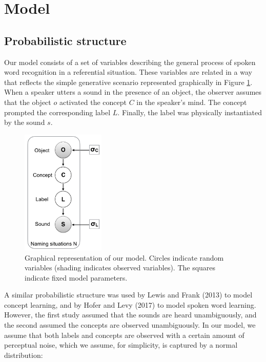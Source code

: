 \documentclass[english,,man,floatsintext]{apa6}
\theoremstyle{definition}
\theoremstyle{definition}
\theoremstyle{definition}
\theoremstyle{remark}
\begin{document}
\section{Model}\label{model}

\subsection{Probabilistic structure}\label{probabilistic-structure}

Our model consists of a set of variables describing the general process
of spoken word recognition in a referential situation. These variables
are related in a way that reflects the simple generative scenario
represented graphically in Figure \ref{fig:model}. When a speaker utters
a sound in the presence of an object, the observer assumes that the
object \(o\) activated the concept \(C\) in the speaker's mind. The
concept prompted the corresponding label \(L\). Finally, the label was
physically instantiated by the sound \(s\).

\begin{figure}

{\centering \includegraphics[width=150px]{figs/model} 

}

\caption{Graphical representation of our model. Circles indicate random variables (shading indicates observed variables). The squares indicate fixed model parameters.}\label{fig:model}
\end{figure}

A similar probabilistic structure was used by Lewis and Frank (2013) to
model concept learning, and by Hofer and Levy (2017) to model spoken
word learning. However, the first study assumed that the sounds are
heard unambiguously, and the second assumed the concepts are observed
unambiguously. In our model, we assume that both labels and concepts are
observed with a certain amount of perceptual noise, which we assume, for
simplicity, is captured by a normal distribution:
\end{document}
